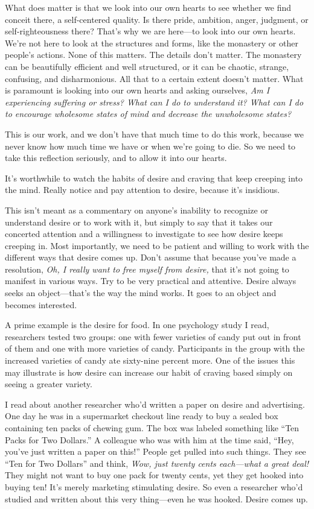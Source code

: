 What does matter is that we look into our own hearts to see whether we 
find conceit there, a self-centered quality. Is there pride, ambition, 
anger, judgment, or self-righteousness there? That's why we are 
here---to look into our own hearts. We're not here to look at the 
structures and forms, like the monastery or other people's actions. 
None of this matters. The details don't matter. The monastery can be 
beautifully efficient and well structured, or it can be chaotic, 
strange, confusing, and disharmonious. All that to a certain extent 
doesn't matter. What is paramount is looking into our own hearts and 
asking ourselves, \emph{Am I experiencing suffering or stress? What can 
I do to understand it? What can I do to encourage wholesome states of 
mind and decrease the unwholesome states?}

This is our work, and we don't have that much time to do this work, 
because we never know how much time we have or when we're going to die. 
So we need to take this reflection seriously, and to allow it into our 
hearts.


It's worthwhile to watch the habits of desire and craving that keep 
creeping into the mind. Really notice and pay attention to desire, 
because it's insidious.

This isn't meant as a commentary on anyone's inability to recognize or 
understand desire or to work with it, but simply to say that it takes 
our concerted attention and a willingness to investigate to see how 
desire keeps creeping in. Most importantly, we need to be patient and 
willing to work with the different ways that desire comes up. Don't 
assume that because you've made a resolution, \emph{Oh, I really want 
to free myself from desire,} that it's not going to manifest in various 
ways. Try to be very practical and attentive. Desire always seeks an 
object---that's the way the mind works. It goes to an object and 
becomes interested.

A prime example is the desire for food. In one psychology study I read, 
researchers tested two groups: one with fewer varieties of candy put 
out in front of them and one with more varieties of candy. Participants 
in the group with the increased varieties of candy ate sixty-nine 
percent more. One of the issues this may illustrate is how desire can 
increase our habit of craving based simply on seeing a greater variety.

I read about another researcher who'd written a paper on desire and 
advertising. One day he was in a supermarket checkout line ready to buy 
a sealed box containing ten packs of chewing gum. The box was labeled 
something like ``Ten Packs for Two Dollars.'' A colleague who was with 
him at the time said, ``Hey, you've just written a paper on this!'' 
People get pulled into such things. They see ``Ten for Two Dollars'' 
and think, \emph{Wow, just twenty cents each---what a great deal!} They 
might not want to buy one pack for twenty cents, yet they get hooked 
into buying ten! It's merely marketing stimulating desire. So even a 
researcher who'd studied and written about this very thing---even he 
was hooked. Desire comes up.

